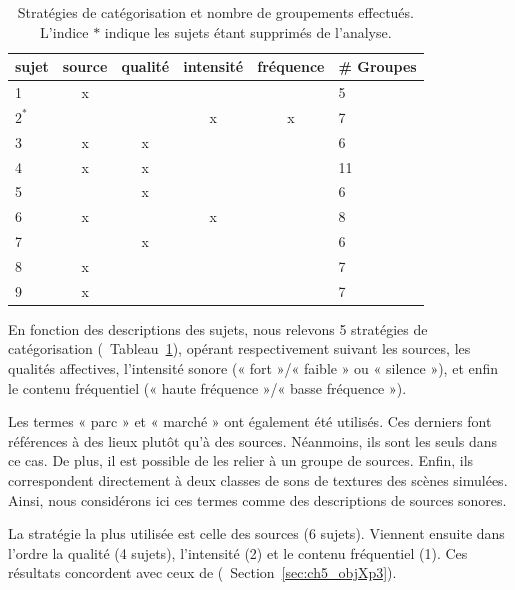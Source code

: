 \begin{table}[t]
\centering
\begin{tabular}{l|cccc|l} 
sujet    & source & qualité & intensité & fréquence & \# Groupes \\
\hline
    1    &   x    &         &        &           & 5  \\
    $2^*$&        &         &    x   &     x     & 7  \\
    3    &   x    &    x    &        &           & 6  \\
    4    &   x    &    x    &        &           & 11 \\        
    5    &        &    x    &        &           & 6  \\
    6    &   x    &         &    x   &           & 8  \\
    7    &        &    x    &        &           & 6  \\
    8    &   x    &         &        &           & 7  \\
    9    &   x    &         &        &           & 7  \\
\hline
\end{tabular}
\vspace{0.5mm}
\caption[Stratégies de catégorisation et nombre de groupements effectués.]{Stratégies de catégorisation et nombre de groupements effectués. L'indice $*$ indique les sujets étant supprimés de l'analyse.}
\label{tab:StratSate}
\end{table}

En fonction des descriptions des sujets, nous relevons 5 stratégies de catégorisation (\cf~Tableau~\ref{tab:StratSate}), opérant respectivement suivant les sources, les qualités affectives, l'intensité sonore (« fort »/« faible » ou « silence »), et enfin le contenu fréquentiel (« haute fréquence »/« basse fréquence »). 

Les termes « parc » et « marché » ont également été utilisés. Ces derniers font références à des lieux plutôt qu'à des sources. Néanmoins, ils sont les seuls dans ce cas. De plus, il est possible de les relier à un groupe de sources. Enfin, ils correspondent directement à deux classes de sons de textures des scènes simulées. Ainsi, nous considérons ici ces termes comme des descriptions de sources sonores.

La stratégie la plus utilisée est celle des sources (6 sujets). Viennent ensuite dans l'ordre la qualité (4 sujets), l'intensité (2) et le contenu fréquentiel (1). Ces résultats concordent avec ceux de \cite{maffiolo_caracterisation_1999} (\cf~Section~\ref{sec:ch5_objXp3}).

